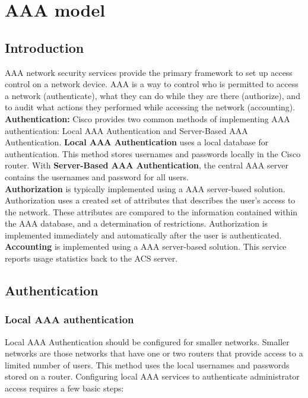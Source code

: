 \chapter{AAA model}

\section{Introduction}

AAA network security services provide the primary framework to set up access control on a network device. AAA is a way to control who is permitted to access a network (authenticate), what they can do while they are there (authorize), and to audit what actions they performed while accessing the network (accounting).\\

\textbf{Authentication:} Cisco provides two common methods of implementing AAA authentication: Local AAA Authentication and Server-Based AAA Authentication. \textbf{Local AAA Authentication} uses a local database for authentication. This method stores usernames and passwords locally in the Cisco router. With \textbf{Server-Based AAA Authentication}, the central AAA server contains the usernames and password for all users.\\

\textbf{Authorization} is typically implemented using a AAA server-based solution. Authorization uses a created set of attributes that describes the user’s access to the network. These attributes are compared to the information contained within the AAA database, and a determination of restrictions. Authorization is implemented immediately and automatically after the user is authenticated.\\

\textbf{Accounting} is implemented using a AAA server-based solution. This service reports usage statistics back to the ACS server. 

\section{Authentication}

\subsection{Local AAA authentication}

Local AAA Authentication should be configured for smaller networks. Smaller networks are those networks that have one or two routers that provide access to a limited number of users. This method uses the local usernames and passwords stored on a router. Configuring local AAA services to authenticate administrator access requires a few basic steps:


